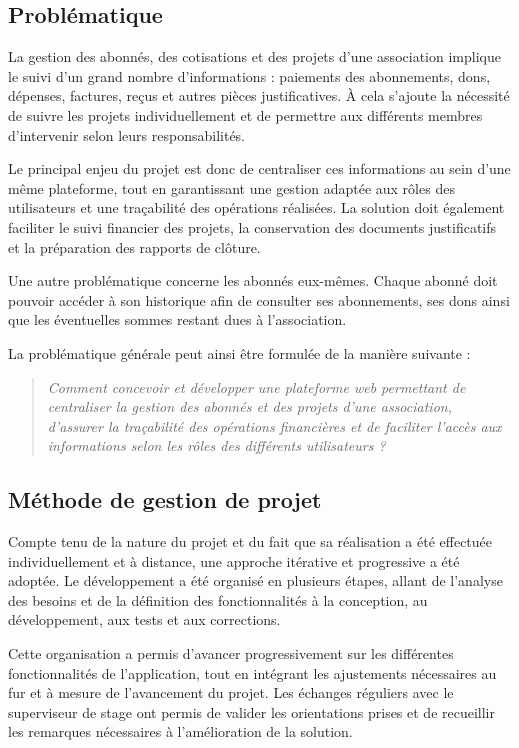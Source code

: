 \subsection{Problématique}

La gestion des abonnés, des cotisations et des projets d'une association implique le suivi d'un grand nombre d'informations : paiements des abonnements, dons, dépenses, factures, reçus et autres pièces justificatives. À cela s'ajoute la nécessité de suivre les projets individuellement et de permettre aux différents membres d'intervenir selon leurs responsabilités.

Le principal enjeu du projet est donc de centraliser ces informations au sein d'une même plateforme, tout en garantissant une gestion adaptée aux rôles des utilisateurs et une traçabilité des opérations réalisées. La solution doit également faciliter le suivi financier des projets, la conservation des documents justificatifs et la préparation des rapports de clôture.

Une autre problématique concerne les abonnés eux-mêmes. Chaque abonné doit pouvoir accéder à son historique afin de consulter ses abonnements, ses dons ainsi que les éventuelles sommes restant dues à l'association.

La problématique générale peut ainsi être formulée de la manière suivante :

\begin{quote}
\textit{Comment concevoir et développer une plateforme web permettant de centraliser la gestion des abonnés et des projets d'une association, d'assurer la traçabilité des opérations financières et de faciliter l'accès aux informations selon les rôles des différents utilisateurs ?}
\end{quote}

\subsection{Méthode de gestion de projet}

Compte tenu de la nature du projet et du fait que sa réalisation a été effectuée individuellement et à distance, une approche itérative et progressive a été adoptée. Le développement a été organisé en plusieurs étapes, allant de l'analyse des besoins et de la définition des fonctionnalités à la conception, au développement, aux tests et aux corrections.

Cette organisation a permis d'avancer progressivement sur les différentes fonctionnalités de l'application, tout en intégrant les ajustements nécessaires au fur et à mesure de l'avancement du projet. Les échanges réguliers avec le superviseur de stage ont permis de valider les orientations prises et de recueillir les remarques nécessaires à l'amélioration de la solution.

